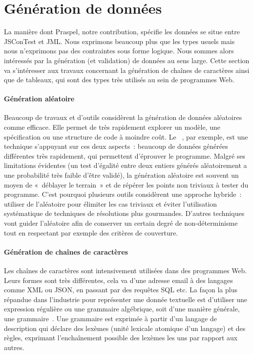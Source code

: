 

\section{Génération de données}

La manière dont Praspel, notre contribution, spécifie les données se situe entre
JSConTest et JML. Nous exprimons beaucoup plus que les types usuels mais nous
n'exprimons pas des contraintes sous forme logique. Nous sommes alors
intéressés par la génération (et validation) de données au sens large. Cette
section va s'intéresser aux travaux concernant la génération de chaînes de
caractères ainsi que de tableaux, qui sont des types très utilisés au sein de
programmes Web.

\paragraph{Génération aléatoire} Beaucoup de travaux et d'outils considèrent la
génération de données aléatoires comme efficace. Elle permet de très rapidement
explorer un modèle, une spécification ou une structure de code à moindre coût.
Le ~, par exemple, est une technique
s'appuyant sur ces deux aspects~: beaucoup de données générées différentes très
rapidement, qui permettent d'éprouver le programme. Malgré ses limitations
évidentes (un test d'égalité entre deux entiers générés aléatoirement a une
probabilité très faible d'être validé), la génération aléatoire est souvent un
moyen de «~déblayer le terrain~» et de répérer les points non triviaux à tester
du programme. C'est pourquoi plusieurs outils considèrent une approche hybride~:
utiliser de l'aléatoire pour élimiter les cas triviaux et éviter l'utilisation
systématique de techniques de résolutions plus gourmandes. D'autres techniques
vont guider l'aléatoire afin de conserver un certain degré de non-déterminisme
tout en respectant par exemple des critères de couverture.

\paragraph{Génération de chaînes de caractères} Les chaînes de caractères sont
intensivement utilisées dans des programmes Web.  Leurs formes sont très
différentes, cela va d'une adresse email à des langages comme XML ou JSON, en
passant par des requêtes SQL etc. La façon la plus répandue dans l'industrie
pour représenter une donnée textuelle est d'utiliser une expression régulière ou
une grammaire algébrique, soit d'une manière générale, une
grammaire~. Une grammaire est exprimée à partir d'un {\strong
langage de description} qui déclare des {\strong lexèmes} (unité lexicale
atomique d'un langage) et des {\strong règles}, exprimant l'enchaînement
possible des lexèmes les uns par rapport aux autres.

